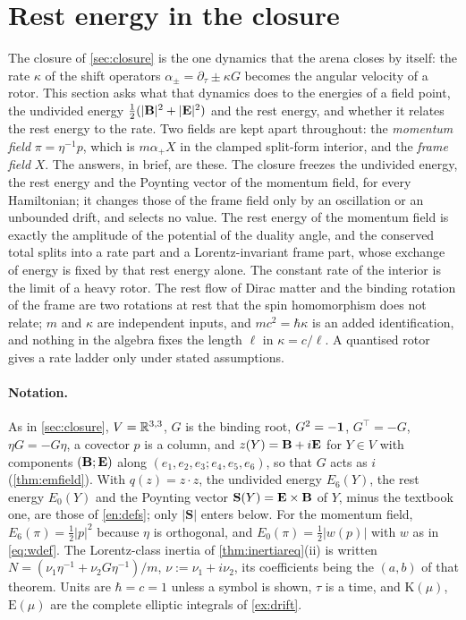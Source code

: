 \section{Rest energy in the closure}
\label{sec:restclosure}

The closure of \cref{sec:closure} is the one dynamics that the arena closes by itself: the rate $\kappa$ of the shift operators
$\alpha_\pm=\partial_\tau\pm\kappa G$ becomes the angular velocity of a rotor. This section asks what that dynamics does to the energies of a
field point, the undivided energy $\tfrac12(|\mathbf B|^2+|\mathbf E|^2)$ and the rest energy, and whether it relates the rest energy to the rate. Two fields
are kept apart throughout: the \emph{momentum field} $\pi=\eta^{-1}p$, which is $m\alpha_+X$ in the clamped split-form interior, and the
\emph{frame field} $X$. The answers, in brief, are these. The closure freezes the undivided energy, the rest energy and the Poynting vector of the momentum
field, for every Hamiltonian; it changes those of the frame field only by an oscillation or an unbounded drift, and selects no value. The rest
energy of the momentum field is exactly the amplitude of the potential of the duality angle, and the conserved total splits into a rate part and a
Lorentz-invariant frame part, whose exchange of energy is fixed by that rest energy alone. The constant rate of the interior is the limit of a heavy rotor. The rest flow of Dirac
matter and the binding rotation of the frame are two rotations at rest that the spin homomorphism does not relate; $m$ and $\kappa$ are independent inputs, and $mc^2=\hbar\kappa$ is an added
identification, and nothing in the algebra fixes the length $\ell$ in $\kappa=c/\ell$. A quantised rotor gives a rate ladder only under stated
assumptions.

\paragraph{Notation.} As in \cref{sec:closure}, $V=\mathbb{R}^{3,3}$, $G$ is the binding root, $G^2=-\mathbf 1$, $G^{\!\top}=-G$, $\eta G=-G\eta$, a covector
$p$ is a column, and $z(Y)=\mathbf B+i\mathbf E$ for $Y\in V$ with components $(\mathbf B;\mathbf E)$ along $(e_1,e_2,e_3;e_4,e_5,e_6)$, so that $G$ acts as $i$
(\cref{thm:emfield}). With $q(z)=z\cdot z$, the undivided energy $E_6(Y)$, the rest energy $E_0(Y)$ and the Poynting vector
$\mathbf S(Y)=\mathbf E\times\mathbf B$ of $Y$, minus the textbook one, are those of \eqref{en:defs}; only $|\mathbf S|$ enters below. For the momentum field, $E_6(\pi)=\tfrac12|p|^2$ because $\eta$
is orthogonal, and $E_0(\pi)=\tfrac12|w(p)|$ with $w$ as in \eqref{eq:wdef}. The Lorentz-class inertia of \cref{thm:inertiareq}(ii) is written
$N=(\nu_1\eta^{-1}+\nu_2G\eta^{-1})/m$, $\nu:=\nu_1+i\nu_2$, its coefficients being the $(a,b)$ of that theorem. Units are $\hbar=c=1$ unless a
symbol is shown, $\tau$ is a time, and $\mathrm K(\mu)$, $\mathrm E(\mu)$ are the complete elliptic integrals of \cref{ex:drift}.

